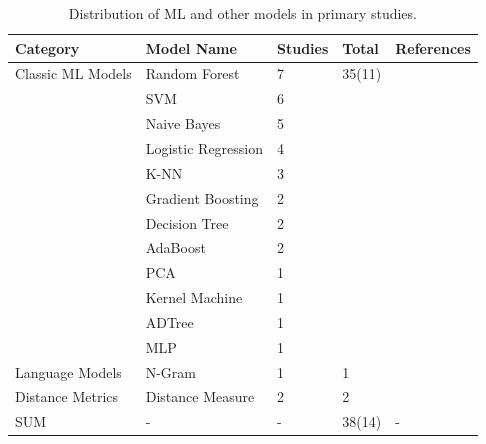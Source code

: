 \begin{table}[H]
\caption{Distribution of ML and other models in primary studies.}
\begin{tabular}{lllll}
\toprule
Category         & Model Name               & Studies & Total & References\\
\midrule
\multirow{1}{*}{Classic ML Models} & Random Forest & 7 & \multirow{1}{*}{35(11)} & \cite{chen2020machine,
sabetta2018practical,
zhou2017automated,
kronjee2018discovering,
pascarella2019fine,
scandariato2014predicting,
Vuldiggerpaper}\\
                 & SVM                      & 6       &       & \cite{chen2020machine,
sabetta2018practical,
zhou2017automated,
scandariato2014predicting,
perl2015vccfinder,
riom2021revisiting} \\
                 & Naive Bayes              & 5      &       & \cite{chen2020machine,
zhou2017automated,
kronjee2018discovering,
pascarella2019fine,
scandariato2014predicting} \\
                 & Logistic Regression      & 4       &       & \cite{sabetta2018practical,
zhou2017automated,
kronjee2018discovering,
pascarella2019fine} \\
                 & K-NN                  & 3       &       & \cite{chen2020machine,
zhou2017automated,
scandariato2014predicting} \\
                 & Gradient Boosting        & 2       &       & \cite{chen2020machine,
zhou2017automated}  \\
                 & Decision Tree            & 2       &       & \cite{kronjee2018discovering,
scandariato2014predicting} \\
                 & AdaBoost                      & 2       &       & \cite{chen2020machine,
zhou2017automated}\\
                 & PCA                      & 1       &       & \cite{yamaguchi2011vulnerability} \\
                 & Kernel Machine           & 1       &       & \cite{nguyen2020deep} \\
                 & ADTree                   & 1       &       & \cite{pascarella2019fine} \\
                 & MLP                      & 1       &       & \cite{pascarella2019fine}\\
                 \hline
Language Models  & N-Gram                   & 1       & 1     & \cite{shippey2019automatically}\\
\hline
Distance Metrics & Distance Measure         & 2       & 2   & \cite{yamaguchi2013chucky, huang2021hunting}\\
\hline
SUM & -         & -       & 38(14)   & -\\
\bottomrule
\end{tabular}
\label{tbl:ML_dist}
\end{table}